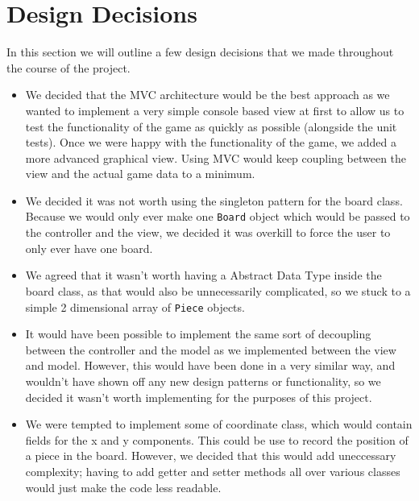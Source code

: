 \documentclass[11pt,a4paper,oneside]{article}
\begin{document}
\section*{Design Decisions}
In this section we will outline a few design decisions that we made throughout the course of the project.

\begin{itemize}
\item We decided that the MVC architecture would be the best approach as we wanted to implement a very simple console based view at first to allow us to test the functionality of the game as quickly as possible (alongside the unit tests). Once we were happy with the functionality of the game, we added a more advanced graphical view. Using MVC would keep coupling between the view and the actual game data to a minimum.

\item We decided it was not worth using the singleton pattern for the board class. Because we would only ever make one \texttt{Board} object which would be passed to the controller and the view, we decided it was overkill to force the user to only ever have one board.

\item We agreed that it wasn't worth having a Abstract Data Type inside the board class, as that would also be unnecessarily complicated, so we stuck to a simple 2 dimensional array of \texttt{Piece} objects.

\item It would have been possible to implement the same sort of decoupling between the controller and the model as we implemented between the view and model. However, this would have been done in a very similar way, and wouldn't have shown off any new design patterns or functionality, so we decided it wasn't worth implementing for the purposes of this project.

\item We were tempted to implement some of coordinate class, which would contain fields for the x and y components. This could be use to record the position of a piece in the board. However, we decided that this would add uneccessary complexity; having to add getter and setter methods all over various classes would just make the code less readable.
\end{itemize}
\end{document}
